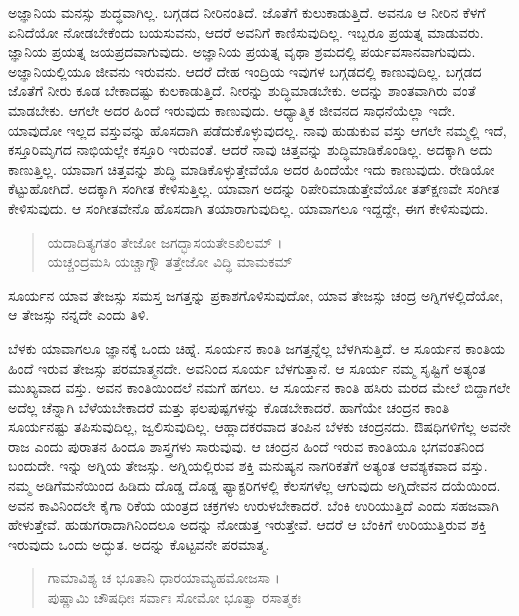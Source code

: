 ಅಜ್ಞಾನಿಯ ಮನಸ್ಸು ಶುದ್ಧವಾಗಿಲ್ಲ. ಬಗ್ಗಡದ ನೀರಿನಂತಿದೆ. ಜೊತೆಗೆ ಕುಲುಕಾಡುತ್ತಿದೆ. ಅವನೂ ಆ ನೀರಿನ ಕೆಳಗೆ ಏನಿದೆಯೋ ನೋಡಬೇಕೆಂದು ಬಯಸುವನು, ಆದರೆ ಅವನಿಗೆ ಕಾಣಿಸುವುದಿಲ್ಲ. ಇಬ್ಬರೂ ಪ್ರಯತ್ನ ಮಾಡುವರು. ಜ್ಞಾನಿಯ ಪ್ರಯತ್ನ ಜಯಪ್ರದವಾಗುವುದು. ಅಜ್ಞಾನಿಯ ಪ್ರಯತ್ನ ವೃಥಾ ಶ್ರಮದಲ್ಲಿ ಪರ್ಯವಸಾನವಾಗುವುದು. ಅಜ್ಞಾನಿಯಲ್ಲಿಯೂ ಜೀವನು ಇರುವನು. ಆದರೆ ದೇಹ ಇಂದ್ರಿಯ ಇವುಗಳ ಬಗ್ಗಡದಲ್ಲಿ ಕಾಣುವುದಿಲ್ಲ. ಬಗ್ಗಡದ ಜೊತೆಗೆ ನೀರು ಕೂಡ ಬೇಕಾದಷ್ಟು ಕುಲಕಾಡುತ್ತಿದೆ. ನೀರನ್ನು ಶುದ್ಧಿಮಾಡಬೇಕು. ಅದನ್ನು ಶಾಂತವಾಗಿರು ವಂತೆ ಮಾಡಬೇಕು. ಆಗಲೇ ಅದರ ಹಿಂದೆ ಇರುವುದು ಕಾಣುವುದು. ಆಧ್ಯಾತ್ಮಿಕ ಜೀವನದ ಸಾಧನೆಯೆಲ್ಲಾ ಇದೇ. ಯಾವುದೋ ಇಲ್ಲದ ವಸ್ತುವನ್ನು ಹೊಸದಾಗಿ ಪಡೆದುಕೊಳ್ಳುವುದಲ್ಲ. ನಾವು ಹುಡುಕುವ ವಸ್ತು ಆಗಲೇ ನಮ್ಮಲ್ಲಿ ಇದೆ, ಕಸ್ತೂರಿಮೃಗದ ನಾಭಿಯಲ್ಲೇ ಕಸ್ತೂರಿ ಇರುವಂತೆ. ಆದರೆ ನಾವು ಚಿತ್ತವನ್ನು ಶುದ್ಧಿಮಾಡಿಕೊಂಡಿಲ್ಲ. ಅದಕ್ಕಾಗಿ ಅದು ಕಾಣುತ್ತಿಲ್ಲ. ಯಾವಾಗ ಚಿತ್ತವನ್ನು ಶುದ್ಧಿ ಮಾಡಿಕೊಳ್ಳುತ್ತೇವೆಯೊ ಅದರ ಹಿಂದೆಯೇ ಇದು ಕಾಣುವುದು. ರೇಡಿಯೋ ಕೆಟ್ಟುಹೋಗಿದೆ. ಅದಕ್ಕಾಗಿ ಸಂಗೀತ ಕೇಳಿಸುತ್ತಿಲ್ಲ. ಯಾವಾಗ ಅದನ್ನು ರಿಪೇರಿಮಾಡುತ್ತೇವೆಯೋ ತತ್​ಕ್ಷಣವೇ ಸಂಗೀತ ಕೇಳಿಸುವುದು. ಆ ಸಂಗೀತವೇನೊ ಹೊಸದಾಗಿ ತಯಾರಾಗುವುದಿಲ್ಲ. ಯಾವಾಗಲೂ ಇದ್ದದ್ದೇ, ಈಗ ಕೇಳಿಸುವುದು.

\begin{verse}
ಯದಾದಿತ್ಯಗತಂ ತೇಜೋ ಜಗದ್ಭಾಸಯತೇಽಖಿಲಮ್ ।\\ಯಚ್ಚಂದ್ರಮಸಿ ಯಚ್ಚಾಗ್ನೌ ತತ್ತೇಜೋ ವಿದ್ಧಿ ಮಾಮಕಮ್ 
\end{verse}

{\small ಸೂರ್ಯನ ಯಾವ ತೇಜಸ್ಸು ಸಮಸ್ತ ಜಗತ್ತನ್ನು ಪ್ರಕಾಶಗೊಳಿಸುವುದೋ, ಯಾವ ತೇಜಸ್ಸು ಚಂದ್ರ ಅಗ್ನಿಗಳಲ್ಲಿದೆಯೋ, ಆ ತೇಜಸ್ಸು ನನ್ನದೇ ಎಂದು ತಿಳಿ.}

ಬೆಳಕು ಯಾವಾಗಲೂ ಜ್ಞಾನಕ್ಕೆ ಒಂದು ಚಿಹ್ನೆ. ಸೂರ್ಯನ ಕಾಂತಿ ಜಗತ್ತನ್ನೆಲ್ಲ ಬೆಳಗಿಸುತ್ತಿದೆ. ಆ ಸೂರ್ಯನ ಕಾಂತಿಯ ಹಿಂದೆ ಇರುವ ತೇಜಸ್ಸು ಪರಮಾತ್ಮನದೇ. ಅವನಿಂದ ಸೂರ್ಯ ಬೆಳಗುತ್ತಾನೆ. ಆ ಸೂರ್ಯ ನಮ್ಮ ಸೃಷ್ಟಿಗೆ ಅತ್ಯಂತ ಮುಖ್ಯವಾದ ವಸ್ತು. ಅವನ ಕಾಂತಿಯಿಂದಲೆ ನಮಗೆ ಹಗಲು. ಆ ಸೂರ್ಯನ ಕಾಂತಿ ಹಸಿರು ಮರದ ಮೇಲೆ ಬಿದ್ದಾಗಲೇ ಅದೆಲ್ಲ ಚೆನ್ನಾಗಿ ಬೆಳೆಯಬೇಕಾದರೆ ಮತ್ತು ಫಲಪುಷ್ಪಗಳನ್ನು ಕೊಡಬೇಕಾದರೆ. ಹಾಗೆಯೇ ಚಂದ್ರನ ಕಾಂತಿ ಸೂರ್ಯನಷ್ಟು ತಪಿಸುವುದಿಲ್ಲ, ಜ್ವಲಿಸುವುದಿಲ್ಲ. ಆಹ್ಲಾದಕರವಾದ ತಂಪಿನ ಬೆಳಕು ಚಂದ್ರನದು. ಔಷಧಿಗಳಿಗೆಲ್ಲ ಅವನೇ ರಾಜ ಎಂದು ಪುರಾತನ ಹಿಂದೂ ಶಾಸ್ತ್ರಗಳು ಸಾರುವುವು. ಆ ಚಂದ್ರನ ಹಿಂದೆ ಇರುವ ಕಾಂತಿಯೂ ಭಗವಂತನಿಂದ ಬಂದುದೇ. ಇನ್ನು ಅಗ್ನಿಯ ತೇಜಸ್ಸು. ಅಗ್ನಿಯಲ್ಲಿರುವ ಶಕ್ತಿ ಮನುಷ್ಯನ ನಾಗರಿಕತೆಗೆ ಅತ್ಯಂತ ಆವಶ್ಯಕವಾದ ವಸ್ತು. ನಮ್ಮ ಅಡಿಗೆಮನೆಯಿಂದ ಹಿಡಿದು ದೊಡ್ಡ ದೊಡ್ಡ ಫ್ಯಾಕ್ಟರಿಗಳಲ್ಲಿ ಕೆಲಸಗಳೆಲ್ಲ ಆಗುವುದು ಅಗ್ನಿದೇವನ ದಯೆಯಿಂದ. ಅವನ ಕಾವಿನಿಂದಲೇ ಕೈಗಾ ರಿಕೆಯ ಯಂತ್ರದ ಚಕ್ರಗಳು ಉರುಳಬೇಕಾದರೆ. ಬೆಂಕಿ ಉರಿಯುತ್ತಿದೆ ಎಂದು ಸಹಜವಾಗಿ ಹೇಳುತ್ತೇವೆ. ಹುಡುಗರಾದಾಗಿನಿಂದಲೂ ಅದನ್ನು ನೋಡುತ್ತ ಇರುತ್ತೇವೆ. ಆದರೆ ಆ ಬೆಂಕಿಗೆ ಉರಿಯುತ್ತಿರುವ ಶಕ್ತಿ ಇರುವುದು ಒಂದು ಅದ್ಭುತ. ಅದನ್ನು ಕೊಟ್ಟವನೇ ಪರಮಾತ್ಮ.

\begin{verse}
ಗಾಮಾವಿಶ್ಯ ಚ ಭೂತಾನಿ ಧಾರಯಾಮ್ಯಹಮೋಜಸಾ ।\\ಪುಷ್ಣಾಮಿ ಚೌಷಧೀಃ ಸರ್ವಾಃ ಸೋಮೋ ಭೂತ್ವಾ ರಸಾತ್ಮಕಃ 
\end{verse}

